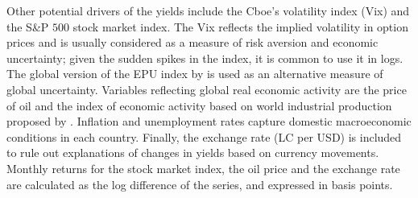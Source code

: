 {Other potential drivers of the yields include 
the Cboe's volatility index (Vix) and the S\&P \(500\) stock market index. 
The Vix reflects the implied volatility in option prices and is usually considered as a measure of risk aversion and economic uncertainty; given the sudden spikes in the index, it is common to use it in logs.
The global version of the EPU index by \cite{BakerBloomDavis:2016} is used as an alternative measure of global uncertainty.
Variables reflecting global real economic activity are the price of oil and the index of economic activity based on world industrial production proposed by \cite{Hamilton:2019}.
Inflation and unemployment rates capture domestic macroeconomic conditions in each country.
Finally, the exchange rate (LC per USD) is included to rule out explanations of changes in yields based on currency movements.
Monthly returns for the stock market index, the oil price and the exchange rate are calculated as the log difference of the series, and expressed in basis points.

}
